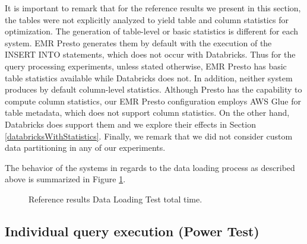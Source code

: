It is important to remark that for the reference results we present in this section, the tables were not explicitly analyzed to yield table and column statistics for optimization. The generation of table-level or basic statistics is different for each system. EMR Presto generates them by default with the execution of the INSERT INTO statements, which does not occur with Databricks. Thus for the query processing experiments, unless stated otherwise, EMR Presto has basic table statistics available while Databricks does not. In addition, neither system produces by default column-level statistics. Although Presto has the capability to compute column statistics, our EMR Presto configuration employs AWS Glue for table metadata, which does not support column statistics. On the other hand, Databricks does support them and we explore their effects in Section \ref{databricksWithStatistics}. Finally, we remark that we did not consider custom data partitioning in any of our experiments.

The behavior of the systems in regards to the data loading process as described above is summarized in Figure \ref{fig:referenceResultsDataLoading}.

\begin{figure}
   \begin{center}
   \end{center}
   \caption{Reference results Data Loading Test total time.}
   \label{fig:referenceResultsDataLoading}
\end{figure}

\subsection{Individual query execution (Power Test)}\label{referenceResultsPowerTest}

